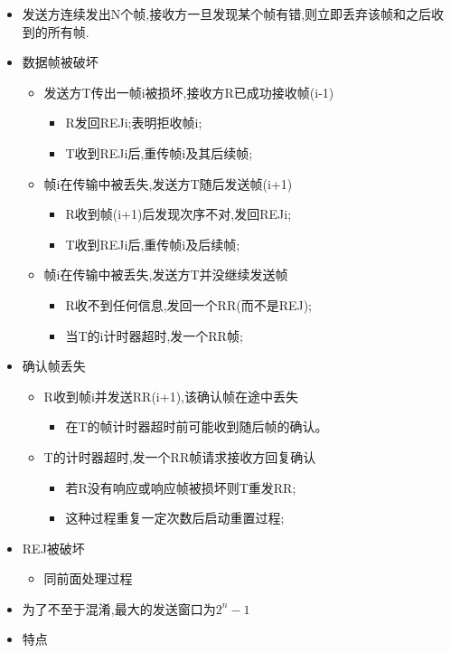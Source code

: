 \documentclass[a4paper,12pt,notitlepage]{article}
\begin{document}
\begin{itemize}
\begin{itemize}
		\item 发送方连续发出N个帧,接收方一旦发现某个帧有错,则立即丢弃该帧和之后收到的所有帧.
		\item 数据帧被破坏
		\begin{itemize}
			\item 发送方T传出一帧i被损坏,接收方R已成功接收帧(i-1)
			\begin{itemize}
				\item R发回REJi;表明拒收帧i;
				\item T收到REJi后,重传帧i及其后续帧;
			\end{itemize}
			\item 帧i在传输中被丢失,发送方T随后发送帧(i+1)
			\begin{itemize}
				\item R收到帧(i+1)后发现次序不对,发回REJi;
				\item T收到REJi后,重传帧i及后续帧;
			\end{itemize}
			\item 帧i在传输中被丢失,发送方T并没继续发送帧
			\begin{itemize}
				\item R收不到任何信息,发回一个RR(而不是REJ);
				\item 当T的i计时器超时,发一个RR帧;
			\end{itemize}
		\end{itemize}
		\item 确认帧丢失
		\begin{itemize}
			\item R收到帧i并发送RR(i+1),该确认帧在途中丢失
			\begin{itemize}
				\item 在T的帧计时器超时前可能收到随后帧的确认。
			\end{itemize}
			\item T的计时器超时,发一个RR帧请求接收方回复确认
			\begin{itemize}
				\item 若R没有响应或响应帧被损坏则T重发RR;
				\item 这种过程重复一定次数后启动重置过程;
			\end{itemize}
		\end{itemize}
		\item REJ被破坏
		\begin{itemize}
			\item 同前面处理过程
		\end{itemize}
		\item 为了不至于混淆,最大的发送窗口为$2^n - 1$
		\item 特点

\end{itemize}
\end{itemize}
\end{document}
